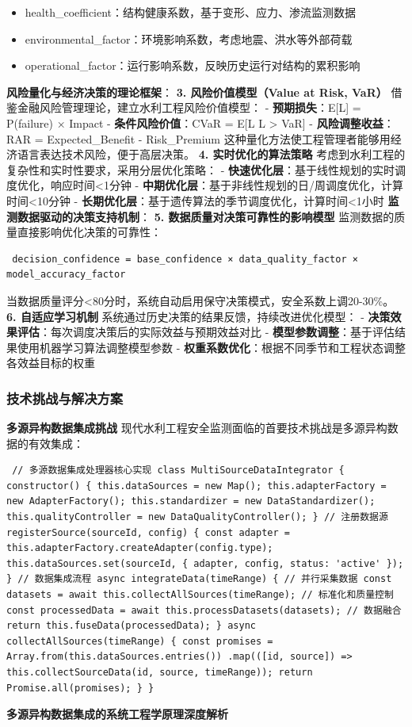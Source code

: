 \begin{itemize} \item health\_coefficient：结构健康系数，基于变形、应力、渗流监测数据 \item environmental\_factor：环境影响系数，考虑地震、洪水等外部荷载 \item operational\_factor：运行影响系数，反映历史运行对结构的累积影响 \end{itemize} \textbf{风险量化与经济决策的理论框架}： \textbf{3. 风险价值模型（Value at Risk, VaR）} 借鉴金融风险管理理论，建立水利工程风险价值模型： - \textbf{预期损失}：E{[}L{]} = P(failure) × Impact - \textbf{条件风险价值}：CVaR = E{[}L \textbar{} L \textgreater{} VaR{]} - \textbf{风险调整收益}：RAR = Expected\_Benefit - Risk\_Premium 这种量化方法使工程管理者能够用经济语言表达技术风险，便于高层决策。 \textbf{4. 实时优化的算法策略} 考虑到水利工程的复杂性和实时性要求，采用分层优化策略： - \textbf{快速优化层}：基于线性规划的实时调度优化，响应时间\textless1分钟 - \textbf{中期优化层}：基于非线性规划的日/周调度优化，计算时间\textless10分钟 - \textbf{长期优化层}：基于遗传算法的季节调度优化，计算时间\textless1小时 \textbf{监测数据驱动的决策支持机制}： \textbf{5. 数据质量对决策可靠性的影响模型} 监测数据的质量直接影响优化决策的可靠性： \begin{verbatim} decision_confidence = base_confidence × data_quality_factor × model_accuracy_factor \end{verbatim} 当数据质量评分\textless80分时，系统自动启用保守决策模式，安全系数上调20-30\%。 \textbf{6. 自适应学习机制} 系统通过历史决策的结果反馈，持续改进优化模型： - \textbf{决策效果评估}：每次调度决策后的实际效益与预期效益对比 - \textbf{模型参数调整}：基于评估结果使用机器学习算法调整模型参数 - \textbf{权重系数优化}：根据不同季节和工程状态调整各效益目标的权重 \subsubsection{技术挑战与解决方案}\label{ux6280ux672fux6311ux6218ux4e0eux89e3ux51b3ux65b9ux6848} \textbf{多源异构数据集成挑战} 现代水利工程安全监测面临的首要技术挑战是多源异构数据的有效集成： \begin{verbatim} // 多源数据集成处理器核心实现 class MultiSourceDataIntegrator { constructor() { this.dataSources = new Map(); this.adapterFactory = new AdapterFactory(); this.standardizer = new DataStandardizer(); this.qualityController = new DataQualityController(); } // 注册数据源 registerSource(sourceId, config) { const adapter = this.adapterFactory.createAdapter(config.type); this.dataSources.set(sourceId, { adapter, config, status: 'active' }); } // 数据集成流程 async integrateData(timeRange) { // 并行采集数据 const datasets = await this.collectAllSources(timeRange); // 标准化和质量控制 const processedData = await this.processDatasets(datasets); // 数据融合 return this.fuseData(processedData); } async collectAllSources(timeRange) { const promises = Array.from(this.dataSources.entries()) .map(([id, source]) => this.collectSourceData(id, source, timeRange)); return Promise.all(promises); } } \end{verbatim} \textbf{多源异构数据集成的系统工程学原理深度解析} 